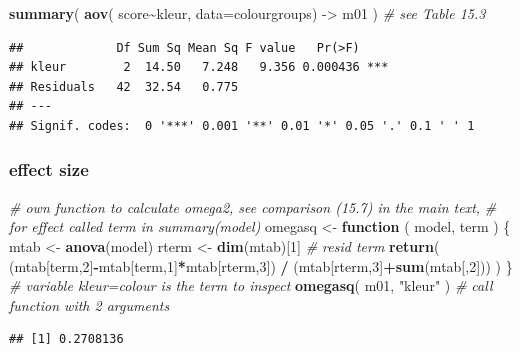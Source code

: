\documentclass[
]{book}
\newenvironment{Shaded}{\begin{snugshade}}{\end{snugshade}}
\newcommand{\AttributeTok}[1]{\textcolor[rgb]{0.13,0.29,0.53}{#1}}
\newcommand{\CommentTok}[1]{\textcolor[rgb]{0.56,0.35,0.01}{\textit{#1}}}
\newcommand{\ControlFlowTok}[1]{\textcolor[rgb]{0.13,0.29,0.53}{\textbf{#1}}}
\newcommand{\DecValTok}[1]{\textcolor[rgb]{0.00,0.00,0.81}{#1}}
\newcommand{\FunctionTok}[1]{\textcolor[rgb]{0.13,0.29,0.53}{\textbf{#1}}}
\newcommand{\NormalTok}[1]{#1}
\newcommand{\OtherTok}[1]{\textcolor[rgb]{0.56,0.35,0.01}{#1}}
\newcommand{\SpecialCharTok}[1]{\textcolor[rgb]{0.81,0.36,0.00}{\textbf{#1}}}
\newcommand{\StringTok}[1]{\textcolor[rgb]{0.31,0.60,0.02}{#1}}
\begin{document}
\begin{Shaded}
\begin{Highlighting}[]
\FunctionTok{summary}\NormalTok{( }\FunctionTok{aov}\NormalTok{( score}\SpecialCharTok{\textasciitilde{}}\NormalTok{kleur, }\AttributeTok{data=}\NormalTok{colourgroups) }\OtherTok{{-}\textgreater{}}\NormalTok{ m01 ) }\CommentTok{\# see Table 15.3}
\end{Highlighting}
\end{Shaded}

\begin{verbatim}
##             Df Sum Sq Mean Sq F value   Pr(>F)    
## kleur        2  14.50   7.248   9.356 0.000436 ***
## Residuals   42  32.54   0.775                     
## ---
## Signif. codes:  0 '***' 0.001 '**' 0.01 '*' 0.05 '.' 0.1 ' ' 1
\end{verbatim}

\subsubsection{effect size}\label{R:omega-square}

\begin{Shaded}
\begin{Highlighting}[]
\CommentTok{\# own function to calculate omega2, see comparison (15.7) in the main text,}
\CommentTok{\# for effect called \textasciigrave{}term\textasciigrave{} in summary(\textasciigrave{}model\textasciigrave{})}
\NormalTok{omegasq }\OtherTok{\textless{}{-}} \ControlFlowTok{function}\NormalTok{ ( model, term ) \{   }
\NormalTok{     mtab }\OtherTok{\textless{}{-}} \FunctionTok{anova}\NormalTok{(model)}
\NormalTok{     rterm }\OtherTok{\textless{}{-}} \FunctionTok{dim}\NormalTok{(mtab)[}\DecValTok{1}\NormalTok{] }\CommentTok{\# resid term}
     \FunctionTok{return}\NormalTok{( (mtab[term,}\DecValTok{2}\NormalTok{]}\SpecialCharTok{{-}}\NormalTok{mtab[term,}\DecValTok{1}\NormalTok{]}\SpecialCharTok{*}\NormalTok{mtab[rterm,}\DecValTok{3}\NormalTok{]) }\SpecialCharTok{/} 
\NormalTok{             (mtab[rterm,}\DecValTok{3}\NormalTok{]}\SpecialCharTok{+}\FunctionTok{sum}\NormalTok{(mtab[,}\DecValTok{2}\NormalTok{])) )}
\NormalTok{\}}
\CommentTok{\# variable kleur=colour is the term to inspect}
\FunctionTok{omegasq}\NormalTok{( m01, }\StringTok{"kleur"}\NormalTok{ ) }\CommentTok{\# call function with 2 arguments}
\end{Highlighting}
\end{Shaded}

\begin{verbatim}
## [1] 0.2708136
\end{verbatim}
\end{document}
